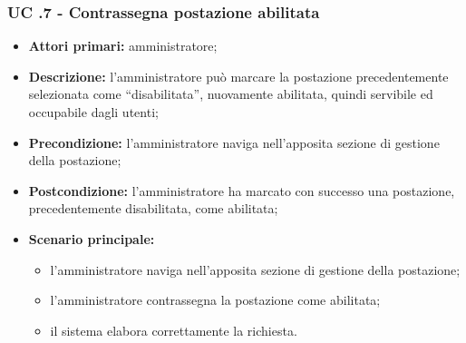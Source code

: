 \subsubsection{UC .7 - Contrassegna postazione abilitata}

\begin{itemize}
\item \textbf{Attori primari:} amministratore;
\item \textbf{Descrizione:} l’amministratore può marcare la postazione precedentemente selezionata come “disabilitata”, nuovamente abilitata, quindi servibile ed occupabile dagli utenti;
\item \textbf{Precondizione:} l’amministratore naviga nell’apposita sezione di gestione della postazione; 
\item \textbf{Postcondizione:} l’amministratore ha marcato con successo una postazione, precedentemente disabilitata, come abilitata;
\item \textbf{Scenario principale:} 
	\begin{itemize}
		\item l’amministratore naviga nell’apposita sezione di gestione della postazione;
		\item l’amministratore contrassegna la postazione come abilitata;
		\item il sistema elabora correttamente la richiesta.
	\end{itemize}
\end{itemize}
